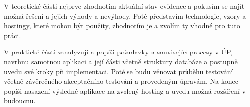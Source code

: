 V teoretické části nejprve zhodnotím aktuální stav evidence a pokusím se najít možná řešení a jejich výhody a nevýhody. Poté představím technologie, vzory a hostingy, které mohou být použity, zhodnotím je a zvolím ty vhodné pro tuto práci.

V praktické části zanalyzuji a popíši požadavky a související procesy v ÚP, navrhnu samotnou aplikaci a její části včetně struktury databáze a postupně uvedu své kroky při implementaci. Poté se budu věnovat průběhu testování včetně závěrečného akceptačního testování a provedeným úpravám. Na konec popíši nasazení výsledné aplikace na zvolený hosting a uvedu možná rozšíření v budoucnu.